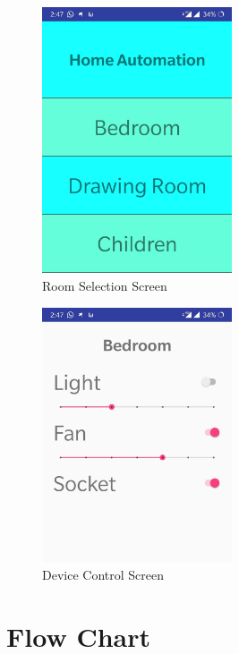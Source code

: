         \begin{figure}[H]
        	\centering
        	\includegraphics[width=0.5\textwidth]{photos/theory/app_screen1.jpg}
        	\caption{Room Selection Screen}
        \end{figure}
	    \begin{figure}[H]
	        \centering
	        \includegraphics[width=0.5\textwidth]{photos/theory/app_screen2.jpg}
	        \caption{Device Control Screen}
	    \end{figure}
        
        
        \section{Flow Chart}
        
